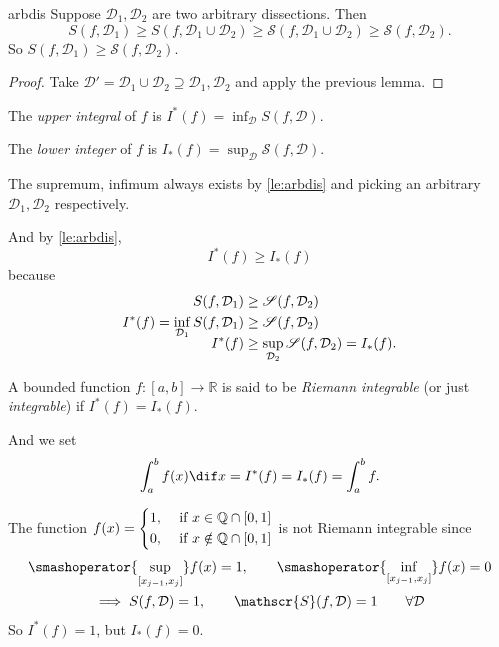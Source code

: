 \begin{lemma}{}{arbdis}
    Suppose \(\mathcal{D}_1, \mathcal{D}_2\) are two arbitrary dissections. Then
    \[
        S(f, \mathcal{D}_1) \geq S(f,\mathcal{D}_1 \cup \mathcal{D}_2) \geq \mathscr{S}(f,\mathcal{D}_1\cup \mathcal{D}_2) \geq \mathscr{S}(f,\mathcal{D}_2).
    \]
    So \(S(f, \mathcal{D}_1)\geq \mathscr{S}(f,\mathcal{D}_2)\).
\end{lemma}
\begin{proof}
    Take \(\mathcal{D}' = \mathcal{D}_1\cup \mathcal{D}_2\supseteq \mathcal{D}_1,\mathcal{D}_2\) and apply the previous lemma.
\end{proof}
\begin{definition}{}{}
    The \textit{upper integral} of \(f\) is \(I^\ast(f) = \inf_{\mathcal{D}}S(f,\mathcal{D})\).

    The \textit{lower integer} of \(f\) is \(I_\ast(f) = \sup_{\mathcal{D}}\mathscr{S}(f, \mathcal{D})\).
\end{definition}
The supremum, infimum always exists by \cref{le:arbdis} and picking an arbitrary \(\mathcal{D}_1, \mathcal{D}_2\) respectively.

And by \cref{le:arbdis},
\[
    I^*(f) \geq I_*(f)
\]
because
\begin{align*}
    S(f, \mathcal{D}_1) &\geq \mathscr{S}(f,\mathcal{D}_2)\\
    I^*(f) = \smash{\inf_{\mathcal{D}_1} S(f,\mathcal{D}_1)} &\geq \mathscr{S}(f,\mathcal{D}_2)\\
    I^*(f) &\geq \sup_{\mathcal{D}_2}\mathscr{S}(f,\mathcal{D}_2) = I_*(f).
\end{align*}
\begin{definition}{}{}
    A bounded function \(f: [a,b] \to \mathbb{R}\) is said to be \textit{Riemann integrable} (or just \textit{integrable}) if \(I^*(f) = I_*(f)\).

    And we set
    \[
        \int_a^b f(x) \dif x = I^*(f) = I_*(f) = \int_a^b f.
    \]
\end{definition}
\begin{example}
    The function \(f(x) = \begin{dcases}
        1, &\text{ if } x\in \mathbb{Q}\cap [0,1]\\
        0, &\text{ if } x\notin \mathbb{Q}\cap [0,1]\\
    \end{dcases}\) is not Riemann integrable since
    \begin{gather*}
        \smashoperator{\sup_{[x_{j-1},x_j]}}f(x) = 1,\qquad \smashoperator{\inf_{[x_{j-1},x_j]}}f(x) = 0\\
        \implies S(f, \mathcal{D}) = 1,\qquad \mathscr{S}(f, \mathcal{D}) = 1 \qquad \forall \mathcal{D}
    \end{gather*}
    So \(I^*(f) = 1\), but \(I_*(f) = 0\).
\end{example}